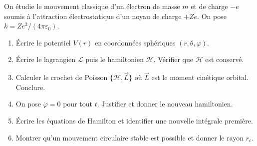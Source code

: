 \documentclass[12pt,a4paper]{article}
\begin{document}
\begin{boiteexercice}
On étudie le mouvement classique d'un électron de masse $m$ et de charge $-e$ soumis à l'attraction électrostatique d'un noyau de charge $+Ze$. On pose $k = Ze^2/(4\pi\varepsilon_0)$.

\begin{enumerate}
  \item Écrire le potentiel $V(r)$ en coordonnées sphériques $(r,\theta,\varphi)$.
  \item Écrire le lagrangien $\mathcal{L}$ puis le hamiltonien $\mathcal{H}$. Vérifier que $\mathcal{H}$ est conservé.
  \item Calculer le crochet de Poisson $\{\mathcal{H}, \vec{L}\}$ où $\vec{L}$ est le moment cinétique orbital. Conclure.
  \item On pose $\dot\varphi = 0$ pour tout $t$. Justifier et donner le nouveau hamiltonien.
  \item Écrire les équations de Hamilton et identifier une nouvelle intégrale première.
  \item Montrer qu'un mouvement circulaire stable est possible et donner le rayon $r_c$.
\end{enumerate}
\end{boiteexercice}
\end{document}
